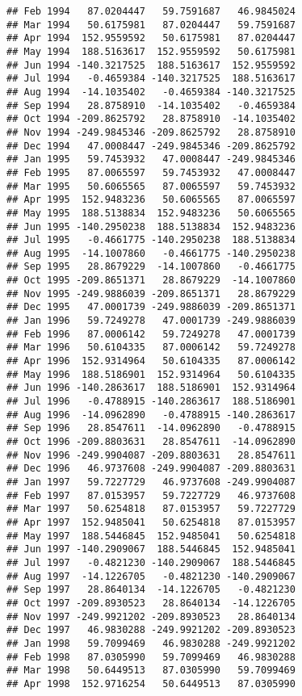 \documentclass[]{article}
\begin{document}
\begin{verbatim}
## Feb 1994   87.0204447   59.7591687   46.9845024
## Mar 1994   50.6175981   87.0204447   59.7591687
## Apr 1994  152.9559592   50.6175981   87.0204447
## May 1994  188.5163617  152.9559592   50.6175981
## Jun 1994 -140.3217525  188.5163617  152.9559592
## Jul 1994   -0.4659384 -140.3217525  188.5163617
## Aug 1994  -14.1035402   -0.4659384 -140.3217525
## Sep 1994   28.8758910  -14.1035402   -0.4659384
## Oct 1994 -209.8625792   28.8758910  -14.1035402
## Nov 1994 -249.9845346 -209.8625792   28.8758910
## Dec 1994   47.0008447 -249.9845346 -209.8625792
## Jan 1995   59.7453932   47.0008447 -249.9845346
## Feb 1995   87.0065597   59.7453932   47.0008447
## Mar 1995   50.6065565   87.0065597   59.7453932
## Apr 1995  152.9483236   50.6065565   87.0065597
## May 1995  188.5138834  152.9483236   50.6065565
## Jun 1995 -140.2950238  188.5138834  152.9483236
## Jul 1995   -0.4661775 -140.2950238  188.5138834
## Aug 1995  -14.1007860   -0.4661775 -140.2950238
## Sep 1995   28.8679229  -14.1007860   -0.4661775
## Oct 1995 -209.8651371   28.8679229  -14.1007860
## Nov 1995 -249.9886039 -209.8651371   28.8679229
## Dec 1995   47.0001739 -249.9886039 -209.8651371
## Jan 1996   59.7249278   47.0001739 -249.9886039
## Feb 1996   87.0006142   59.7249278   47.0001739
## Mar 1996   50.6104335   87.0006142   59.7249278
## Apr 1996  152.9314964   50.6104335   87.0006142
## May 1996  188.5186901  152.9314964   50.6104335
## Jun 1996 -140.2863617  188.5186901  152.9314964
## Jul 1996   -0.4788915 -140.2863617  188.5186901
## Aug 1996  -14.0962890   -0.4788915 -140.2863617
## Sep 1996   28.8547611  -14.0962890   -0.4788915
## Oct 1996 -209.8803631   28.8547611  -14.0962890
## Nov 1996 -249.9904087 -209.8803631   28.8547611
## Dec 1996   46.9737608 -249.9904087 -209.8803631
## Jan 1997   59.7227729   46.9737608 -249.9904087
## Feb 1997   87.0153957   59.7227729   46.9737608
## Mar 1997   50.6254818   87.0153957   59.7227729
## Apr 1997  152.9485041   50.6254818   87.0153957
## May 1997  188.5446845  152.9485041   50.6254818
## Jun 1997 -140.2909067  188.5446845  152.9485041
## Jul 1997   -0.4821230 -140.2909067  188.5446845
## Aug 1997  -14.1226705   -0.4821230 -140.2909067
## Sep 1997   28.8640134  -14.1226705   -0.4821230
## Oct 1997 -209.8930523   28.8640134  -14.1226705
## Nov 1997 -249.9921202 -209.8930523   28.8640134
## Dec 1997   46.9830288 -249.9921202 -209.8930523
## Jan 1998   59.7099469   46.9830288 -249.9921202
## Feb 1998   87.0305990   59.7099469   46.9830288
## Mar 1998   50.6449513   87.0305990   59.7099469
## Apr 1998  152.9716254   50.6449513   87.0305990

\end{verbatim}
\end{document}
